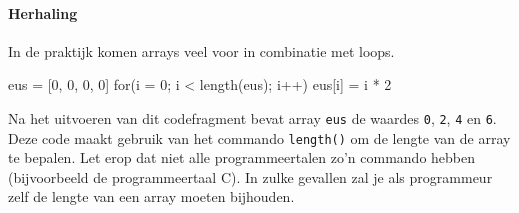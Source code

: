 \paragraph{Herhaling}

In de praktijk komen arrays veel voor in combinatie met loops.

\begin{nnflisting}
eus = [0, 0, 0, 0]
for(i = 0; i < length(eus); i++)
    eus[i] = i * 2
\end{nnflisting}

Na het uitvoeren van dit codefragment bevat array \texttt{eus} de waardes \texttt{0}, \texttt{2}, \texttt{4} en \texttt{6}. Deze code maakt gebruik van het commando \texttt{length()} om de lengte van de array te bepalen. Let erop dat niet alle programmeertalen zo'n commando hebben (bijvoorbeeld de programmeertaal C). In zulke gevallen zal je als programmeur zelf de lengte van een array moeten bijhouden.
